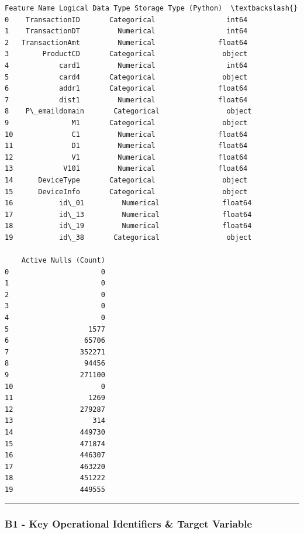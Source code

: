 \documentclass[11pt]{article}
\begin{document}
    
    \begin{Verbatim}[commandchars=\\\{\}]
      Feature Name Logical Data Type Storage Type (Python)  \textbackslash{}
0    TransactionID       Categorical                 int64   
1    TransactionDT         Numerical                 int64   
2   TransactionAmt         Numerical               float64   
3        ProductCD       Categorical                object   
4            card1         Numerical                 int64   
5            card4       Categorical                object   
6            addr1       Categorical               float64   
7            dist1         Numerical               float64   
8    P\_emaildomain       Categorical                object   
9               M1       Categorical                object   
10              C1         Numerical               float64   
11              D1         Numerical               float64   
12              V1         Numerical               float64   
13            V101         Numerical               float64   
14      DeviceType       Categorical                object   
15      DeviceInfo       Categorical                object   
16           id\_01         Numerical               float64   
17           id\_13         Numerical               float64   
18           id\_19         Numerical               float64   
19           id\_38       Categorical                object   

    Active Nulls (Count)  
0                      0  
1                      0  
2                      0  
3                      0  
4                      0  
5                   1577  
6                  65706  
7                 352271  
8                  94456  
9                 271100  
10                     0  
11                  1269  
12                279287  
13                   314  
14                449730  
15                471874  
16                446307  
17                463220  
18                451222  
19                449555  
    \end{Verbatim}

    
    \begin{center}\rule{0.5\linewidth}{0.5pt}\end{center}

\subsubsection{B1 - Key Operational Identifiers \& Target
Variable}\label{b1---key-operational-identifiers-target-variable}
\end{document}
